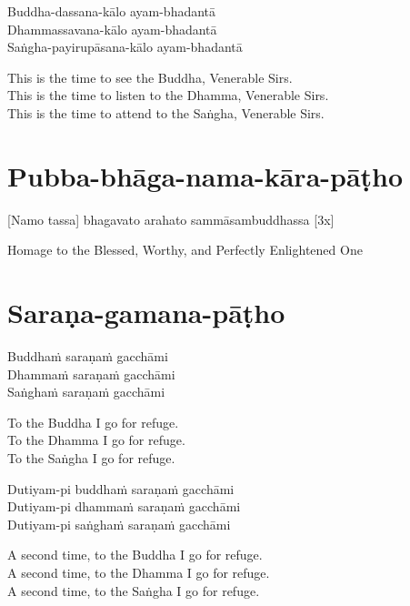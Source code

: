 Buddha-dassana-kālo ayam-bhadantā\\
Dhammassavana-kālo ayam-bhadantā\\
Saṅgha-payirupāsana-kālo ayam-bhadantā

\begin{english-verses}
  This is the time to see the Buddha, Venerable Sirs.\\
  This is the time to listen to the Dhamma, Venerable Sirs.\\
  This is the time to attend to the Saṅgha, Venerable Sirs.
\end{english-verses}

\suttaRef{[Thai]}

\section{Pubba-bhāga-nama-kāra-pāṭho}
\label{pubba-bhaga-nama-kara-patho}
[Namo tassa] bhagavato arahato sammāsambuddhassa \hfill{[3x]}

\begin{english-verses}
  Homage to the Blessed, Worthy, and Perfectly Enlightened One
\end{english-verses}

\section{Saraṇa-gamana-pāṭho}
\label{sarana-gamana-patho}
Buddhaṁ saraṇaṁ gacchāmi\\
Dhammaṁ saraṇaṁ gacchāmi\\
Saṅghaṁ saraṇaṁ gacchāmi

\begin{english-verses}
  To the Buddha I go for refuge.\\
  To the Dhamma I go for refuge.\\
  To the Saṅgha I go for refuge.
\end{english-verses}

Dutiyam-pi buddhaṁ saraṇaṁ gacchāmi\\
Dutiyam-pi dhammaṁ saraṇaṁ gacchāmi\\
Dutiyam-pi saṅghaṁ saraṇaṁ gacchāmi

\begin{english-verses}
  A second time, to the Buddha I go for refuge.\\
  A second time, to the Dhamma I go for refuge.\\
  A second time, to the Saṅgha I go for refuge.
\end{english-verses}

